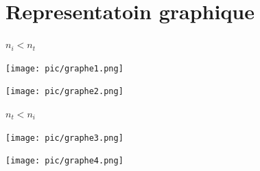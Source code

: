 \documentclass[12pt]{book}
\begin{document}
        \section{Representatoin graphique}
            \underline{$n_i < n_t$} 
                \begin{center}
                    \begin{minipage}{0.24\linewidth}
                        \texttt{[image: pic/graphe1.png]}
                    \end{minipage}
                    \begin{minipage}{0.49\linewidth}
                        \texttt{[image: pic/graphe2.png]}
                    \end{minipage}
                \end{center}
            \underline{$n_t < n_i$} 
                \begin{center}
                    \begin{minipage}{0.3\linewidth}
                        \texttt{[image: pic/graphe3.png]}
                    \end{minipage}
                    \begin{minipage}{0.49\linewidth}
                        \texttt{[image: pic/graphe4.png]}
                    \end{minipage}
                \end{center}
\end{document}
